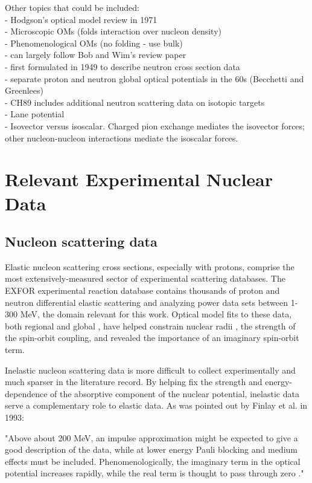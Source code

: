 Other topics that could be included:\\
- Hodgson's optical model review in 1971\\
- Microscopic OMs (folds interaction over nucleon density)\\
- Phenomenological OMs (no folding - use bulk)\\
- can largely follow Bob and Wim's review paper\\
- first formulated in 1949 to describe neutron cross section data\\
- separate proton and neutron global optical potentials in the 60s (Becchetti
and Greenlees)\\
- CH89 includes additional neutron scattering data on isotopic targets\\
- Lane potential \\
- Isovector versus isoscalar. Charged pion exchange mediates the isovector forces;
other nucleon-nucleon interactions mediate the isoscalar forces.

\section{Relevant Experimental Nuclear Data}

\subsection{Nucleon scattering data}
Elastic nucleon scattering cross sections, especially with protons, comprise the most extensively-measured
sector of experimental scattering databases. The EXFOR experimental reaction database
\cite{EXFOR} contains thousands of proton and neutron differential elastic scattering and analyzing
power data sets between 1-300 MeV, the domain relevant for this work. Optical model fits
to these data, both regional and global \cite{CH89, KoningDelaroche}, have helped
constrain nuclear radii \cite{radiusExample}, the strength of the spin-orbit coupling,
and revealed the importance of an imaginary spin-orbit term.

Inelastic nucleon scattering data is more difficult to collect experimentally and much sparser in
the literature record. By helping fix the strength and energy-dependence of the absorptive component
of the nuclear potential, inelastic data serve a complementary role to elastic
data. As was pointed out by Finlay et al. in 1993:

\begin{displayquote}
    "Above about 200 MeV, an impulse approximation might be expected to
    give a good description of the data, while at lower energy Pauli blocking and
    medium effects must be included. Phenomenologically, the imaginary term in
    the optical potential increases rapidly, while the real term is thought to
    pass through zero \cite{Finlay1993}."
\end{displayquote}

